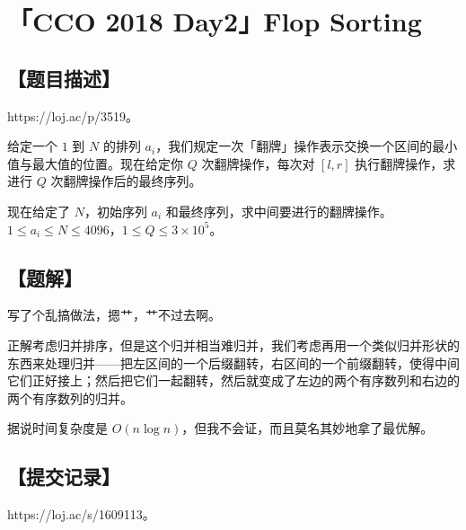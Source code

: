 \documentclass[UTF8,12pt,a4paper]{ctexart}
\begin{document}
	
	\section*{「CCO 2018 Day2」Flop Sorting}
	
	\subsection*{【题目描述】}
	
	https://loj.ac/p/3519。
	
	给定一个 $1$ 到 $N$ 的排列 $a_i$，我们规定一次「翻牌」操作表示交换一个区间的最小值与最大值的位置。现在给定你 $Q$ 次翻牌操作，每次对 $[l,r]$ 执行翻牌操作，求进行 $Q$ 次翻牌操作后的最终序列。
	
	现在给定了 $N$，初始序列 $a_i$ 和最终序列，求中间要进行的翻牌操作。$1 \le a_i \le N \le 4096$，$1 \le Q \le 3 \times 10^5$。
	
	\subsection*{【题解】}
	
	写了个乱搞做法，摁艹，艹不过去啊。
	
	正解考虑归并排序，但是这个归并相当难归并，我们考虑再用一个类似归并形状的东西来处理归并——把左区间的一个后缀翻转，右区间的一个前缀翻转，使得中间它们正好接上；然后把它们一起翻转，然后就变成了左边的两个有序数列和右边的两个有序数列的归并。
	
	据说时间复杂度是 $O(n\log n)$，但我不会证，而且莫名其妙地拿了最优解。
	
	\subsection*{【提交记录】}
	
	https://loj.ac/s/1609113。
	
	
\end{document}
